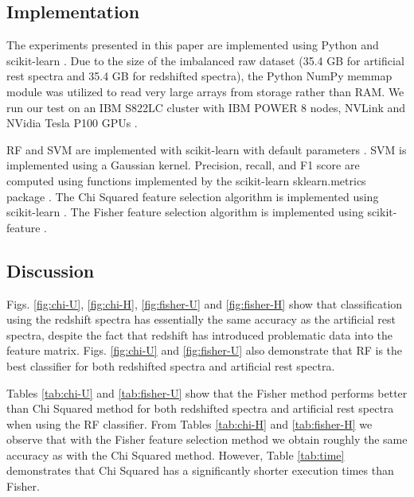 \documentclass[conference]{IEEEtran}
\begin{document}
	\subsection{Implementation}\label{sec:imp}

	The experiments presented in this paper are implemented using Python and scikit-learn \cite{scikit-learn}. Due to the size of the imbalanced raw dataset (35.4 GB for artificial rest spectra and 35.4 GB for redshifted spectra), the Python NumPy memmap \cite{numpy, memmap} module was utilized to read very large arrays from storage rather than RAM. We run our test on an IBM S822LC cluster with IBM POWER 8 nodes, NVLink and NVidia Tesla P100 GPUs \cite{turing}.

	RF and SVM are implemented with scikit-learn with default parameters \cite{scikit-learn}. SVM is implemented using a Gaussian kernel. Precision, recall, and F1 score are computed using functions implemented by the scikit-learn sklearn.metrics package \cite{scikit-learn}. The Chi Squared feature selection algorithm is implemented using scikit-learn \cite{scikit-learn}. The Fisher feature selection algorithm is implemented using scikit-feature \cite{reliefF}.
	\subsection{Discussion}\label{sec:disc}

	Figs. \ref{fig:chi-U}, \ref{fig:chi-H}, \ref{fig:fisher-U} and \ref{fig:fisher-H} show that classification using the redshift spectra has essentially the same accuracy as the artificial rest spectra, despite the fact that redshift has introduced problematic data into the feature matrix. Figs. \ref{fig:chi-U} and  \ref{fig:fisher-U} also demonstrate that RF is the best classifier for both redshifted spectra and artificial rest spectra. 

	Tables \ref{tab:chi-U} and \ref{tab:fisher-U} show that the Fisher method performs better than Chi Squared method for both redshifted spectra and artificial rest spectra when using the RF classifier. From Tables \ref{tab:chi-H} and \ref{tab:fisher-H} we observe that with the Fisher feature selection method we obtain roughly the same accuracy as with the Chi Squared method. However, Table \ref{tab:time} demonstrates that Chi Squared has a significantly shorter execution times than Fisher. 
\end{document}
